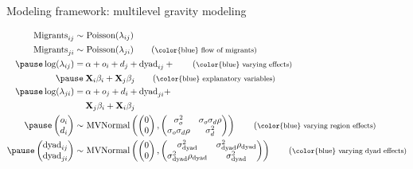 \documentclass{beamer}
\begin{document}
\begin{frame}[fragile]{Modeling framework: multilevel gravity modeling}
\begin{small}
  \begin{align}
	\text{Migrants}_{ij} \sim & \text{ Poisson}(\lambda_{ij}) \notag \\
	\text{Migrants}_{ji} \sim & \text{ Poisson}(\lambda_{ji}) \tag{\footnotesize \color{blue} flow of migrants} \\ \pause
	\log(\lambda_{ij}) =  & \: \alpha + o_{i} + d_{j} + \text{dyad}_{ij} +\tag{\footnotesize
							\color{blue} varying effects}  \\ \pause
							  & \: \mathbf{X}_{i}  \beta_{i}+ \mathbf{X}_{j} \beta_{j}  \tag{\footnotesize \color{blue} explanatory variables}  \\ \pause
	\log(\lambda_{ji}) =  & \: \alpha + o_{j} + d_{i} + \text{dyad}_{ji} + \notag \\
							  & \: \mathbf{X}_{j}  \beta_{i}+ \mathbf{X}_{i} \beta_{j} \notag  \\ \pause
	\left(\begin{matrix} 
		o_{i} \\
		d_{i}
	\end{matrix}\right) \sim& \text{ MVNormal}\left( \left( \begin{matrix}
	0 \\
	0 
	\end{matrix}\right) , \left(\begin{matrix}
	\sigma_o^2 & \sigma_o \sigma_d \rho \\
	 \sigma_o \sigma_d \rho  & \sigma_d^2
   \end{matrix}\right) \right)  \tag{\footnotesize \color{blue} varying region effects}  \\ \pause 	\left(\begin{matrix}
		\text{dyad}_{ij} \\
		\text{dyad}_{ji}
	\end{matrix}\right) \sim& \text{ MVNormal}\left( \left( \begin{matrix}
	0 \\
	0 
	\end{matrix}\right) , \left(\begin{matrix}
	\sigma_{\text{dyad}}^2 & \sigma_{\text{dyad}}^2 \rho_{\text{dyad}} \\
	 \sigma_{\text{dyad}}^2 \rho_{\text{dyad}}  & \sigma_{\text{dyad}}^2
	\end{matrix}\right) \right)  \tag{\footnotesize \color{blue} varying dyad effects}
	\end{align}
\end{small}
\end{frame}
\end{document}
